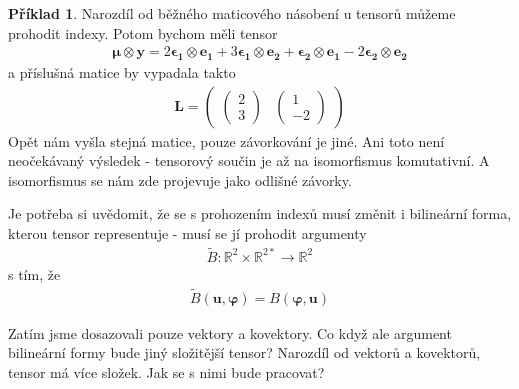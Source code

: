 \documentclass[a5paper,12pt]{amsbook}
\theoremstyle{definition}
\newtheorem{example}{Příklad}[chapter]
\newcommand{\myvec}[1]{\bm{#1}}
\newcommand{\mymatrix}[1]{\mathbf{#1}}
\newcommand{\myspace}[1]{\mathbb{#1}}
\begin{document}
\begin{example}
Narozdíl od běžného maticového násobení u tensorů můžeme prohodit indexy. Potom bychom měli
tensor
\begin{equation*}
\begin{split}
\myvec{\mu}\otimes\myvec{y} 
= 2\myvec{\epsilon_1}\otimes\myvec{e_1}
+ 3\myvec{\epsilon_1}\otimes\myvec{e_2}
+ \myvec{\epsilon_2}\otimes\myvec{e_1}
- 2\myvec{\epsilon_2}\otimes\myvec{e_2}
\end{split}
\end{equation*}
a příslušná matice by vypadala takto
\begin{equation*}
\begin{split}
\mymatrix{L} =
\left(
  \begin{array}{cc}
    \left(
      \begin{array}{c}
        2 \\ 3
      \end{array}
    \right) &
    \left(
      \begin{array}{c}
        1 \\ -2
      \end{array}
    \right)
  \end{array}
\right)
\end{split}
\end{equation*}
Opět nám vyšla stejná matice, pouze závorkování je jiné. Ani toto není neočekávaný výsledek - tensorový
součin je až na isomorfismus komutativní. A isomorfismus se nám zde projevuje jako odlišné závorky.

Je potřeba si uvědomit, že se s prohozením indexů musí změnit i bilineární forma, kterou tensor
representuje - musí se jí prohodit argumenty
\begin{equation*}
\begin{split}
\widetilde{B}: \myspace{R}^2\times\myspace{R}^{2*}\rightarrow\myspace{R}^2
\end{split}
\end{equation*}
s tím, že
\begin{equation*}
\begin{split}
\widetilde{B}(\myvec{u}, \myvec{\varphi}) = B(\myvec{\varphi}, \myvec{u})
\end{split}
\end{equation*}
\end{example}

\medskip\noindent
Zatím jsme dosazovali pouze vektory a kovektory. Co když ale argument bilineární formy bude
jiný složitější tensor? Narozdíl od vektorů a kovektorů, tensor má více složek. Jak se s nimi
bude pracovat?
\end{document}
